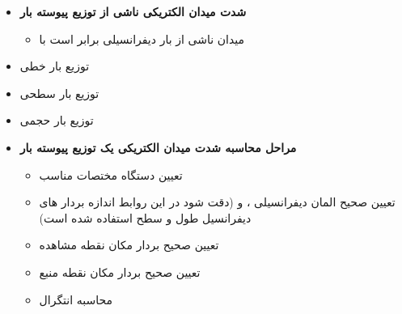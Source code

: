\begin{ELunit}


\begin{itemize}
\tightlist
\item
  \textbf{شدت میدان الکتریکی ناشی از توزیع پیوسته بار}

  \begin{itemize}
  \tightlist
  \item
    میدان ناشی از بار دیفرانسیلی  برابر است با
  \end{itemize}
\end{itemize}


\begin{itemize}
\tightlist
\item
  توزیع بار خطی
\end{itemize}


\begin{itemize}
\tightlist
\item
  توزیع بار سطحی
\end{itemize}


\begin{itemize}
\tightlist
\item
  توزیع بار حجمی
\end{itemize}


\begin{itemize}
\tightlist
\item
  \textbf{مراحل محاسبه شدت میدان الکتریکی یک توزیع پیوسته بار}

  \begin{itemize}
  \tightlist
  \item
    تعیین دستگاه مختصات مناسب
  \item
    تعیین صحیح المان دیفرانسیلی ،  و  (دقت شود در این روابط اندازه بردار های دیفرانسیل طول و سطح استفاده شده است)
  \item
    تعیین صحیح بردار مکان نقطه مشاهده 
  \item
    تعیین صحیح بردار مکان نقطه منبع 
  \item
    محاسبه انتگرال


\end{itemize}
\end{itemize}
\end{ELunit}
